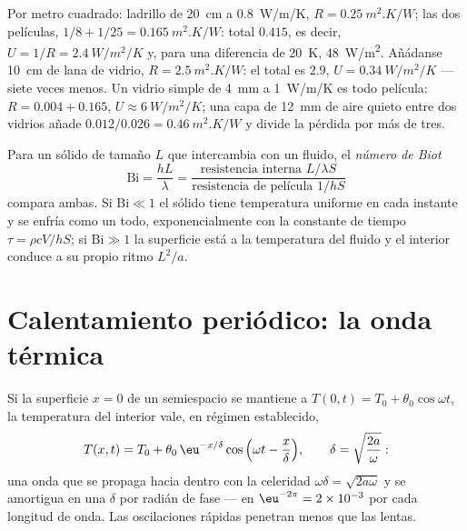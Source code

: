 \begin{example}\label{ex:b2:heat-conduction:wall}
Por metro cuadrado: ladrillo de \qty{20}{cm} a \qty{0.8}{W/m/K}, $R =
\qty{0.25}{m^2.K/W}$; las dos películas, $1/8 + 1/25 = \qty{0.165}{m^2.K/W}$:
total $0.415$, es decir, $U = 1/R = \qty{2.4}{W/m^2/K}$ y, para una diferencia de
\qty{20}{K}, \qty{48}{W/m^2}. Añádanse \qty{10}{cm} de lana de vidrio, $R =
\qty{2.5}{m^2.K/W}$: el total es $2.9$, $U = \qty{0.34}{W/m^2/K}$ ---
siete veces menos. Un vidrio simple de \qty{4}{mm} a \qty{1}{W/m/K}
es todo película: $R = 0.004 + 0.165$, $U \approx \qty{6}{W/m^2/K}$; una
capa de \qty{12}{mm} de aire quieto entre dos vidrios añade $0.012/0.026 =
\qty{0.46}{m^2.K/W}$ y divide la pérdida por más de tres.
\end{example}

\begin{definition}\label{def:b2:heat-conduction:biot}
Para un sólido de tamaño $L$ que intercambia con un fluido, el \emph{número
de Biot}
\[
\mathrm{Bi} = \frac{hL}{\lambda} = \frac{\text{resistencia interna } L/\lambda S}{\text{resistencia de película } 1/hS}
\]
compara ambas. Si $\mathrm{Bi} \ll 1$ el sólido tiene temperatura uniforme
en cada instante y se enfría como un todo, exponencialmente con
la constante de tiempo $\tau = \rho c V/hS$; si $\mathrm{Bi} \gg 1$ la
superficie está a la temperatura del fluido y el interior conduce a su
propio ritmo $L^2/a$.
\end{definition}

\section{Calentamiento periódico: la onda térmica}

\begin{proposition}\label{prop:b2:heat-conduction:wave}
Si la superficie $x = 0$ de un semiespacio se mantiene a $T(0,t) = T_0 +
\theta_0\cos\omega t$, la temperatura del interior vale, en régimen
establecido,
\[
T(x,t) = T_0 + \theta_0\,\eu^{-x/\delta}\cos\Big(\omega t - \frac{x}{\delta}\Big),
\qquad \delta = \sqrt{\frac{2a}{\omega}} :
\]
una onda que se propaga hacia dentro con la celeridad $\omega\delta =
\sqrt{2a\omega}$ y se amortigua en una \emph{} $\delta$
por radián de fase --- en $\eu^{-2\pi} = 2 \times 10^{-3}$ por cada
longitud de onda. Las oscilaciones rápidas penetran menos que las lentas.
\end{proposition}

